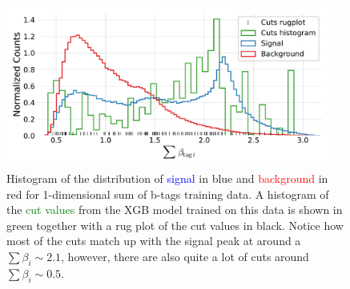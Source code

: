 \begin{figure}
  \includegraphics[width=0.95\textwidth, trim=10 10 10 20, clip]{figures/quarks/gtag_sum_method_njet=4-down_sample=1.00-ML_vars=vertex-selection=b-ejet_min=4-n_iter_RS_lgb=99-n_iter_RS_xgb=9-cdot_cut=0.90-version=19.pdf}
  \caption[1D Sum Model Cuts for 4-jets]
          {Histogram of the distribution of \textcolor{blue}{signal} in blue and \textcolor{red}{background} in red for 1-dimensional sum of b-tags training data. A histogram of the \textcolor{green}{cut values} from the XGB model trained on this data is shown in green together with a rug plot of the cut values in black. Notice how most of the cuts match up with the signal peak at around a $\sum \beta_i \sim 2.1$, however, there are also quite a lot of cuts around $\sum \beta_i \sim 0.5$.
          } 
  \label{fig:q:1d_sum_model_cuts_4j}
\end{figure}


